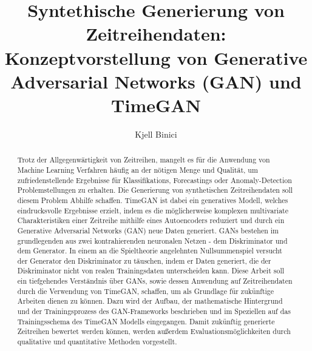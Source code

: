 \documentclass[runningheads]{llncs}
\begin{document}
%
\title{Syntethische Generierung von Zeitreihendaten: Konzeptvorstellung von Generative Adversarial Networks (GAN) und TimeGAN}
%
%
\author{Kjell Binici}
%
%
%
\maketitle              %
%
\begin{abstract}
Trotz der Allgegenwärtigkeit von Zeitreihen, mangelt es für die Anwendung von Machine Learning Verfahren häufig an der nötigen Menge und Qualität, um zufriedenstellende Ergebnisse für Klassifikations, Forecastings oder Anomaly-Detection Problemstellungen zu erhalten. Die Generierung von synthetischen Zeitreihendaten soll diesem Problem Abhilfe schaffen. TimeGAN ist dabei ein generatives Modell, welches eindrucksvolle Ergebnisse erzielt, indem es die möglicherweise komplexen multivariate Charakteristiken einer Zeitreihe mithilfe eines Autoencoders reduziert und durch ein Generative Adversarial Networks (GAN) neue Daten generiert. GANs bestehen im grundlegenden aus zwei kontrahierenden neuronalen Netzen - dem Diskriminator und dem Generator. In einem an die Spieltheorie angelehnten Nullsummenspiel versucht der Generator den Diskriminator zu täuschen, indem er Daten generiert, die der Diskriminator nicht von realen Trainingsdaten unterscheiden kann.
Diese Arbeit soll ein tiefgehendes Verständnis über GANs, sowie dessen Anwendung auf Zeitreihendaten durch die Verwendung von TimeGAN, schaffen, um als Grundlage für zukünftige Arbeiten dienen zu können. Dazu wird der Aufbau, der mathematische Hintergrund und der Trainingsprozess des GAN-Frameworks beschrieben und im Speziellen auf das Trainingsschema des TimeGAN Modells eingegangen. Damit zukünftig generierte Zeitreihen bewertet werden können, werden außerdem Evaluationsmöglichkeiten durch qualitative und quantitative Methoden vorgestellt.

\end{abstract}
%
%
%







%
%
%
% 
% 
%
\printbibliography
%
\end{document}
